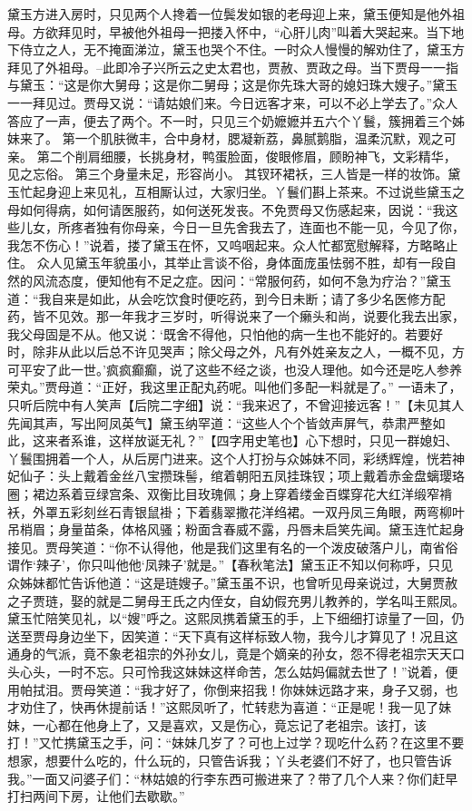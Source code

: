 \documentclass[12pt,oneside]{book}
\begin{document}
黛玉方进入房时，只见两个人搀着一位鬓发如银的老母迎上来，黛玉便知是他外祖母。方欲拜见时，早被他外祖母一把搂入怀中，“心肝儿肉”叫着大哭起来。当下地下侍立之人，无不掩面涕泣，黛玉也哭个不住。一时众人慢慢的解劝住了，黛玉方拜见了外祖母。--此即冷子兴所云之史太君也，贾赦、贾政之母。当下贾母一一指与黛玉：“这是你大舅母；这是你二舅母；这是你先珠大哥的媳妇珠大嫂子。”黛玉一一拜见过。贾母又说：“请姑娘们来。今日远客才来，可以不必上学去了。”众人答应了一声，便去了两个。不一时，只见三个奶嬷嬷并五六个丫鬟，簇拥着三个姊妹来了。
第一个肌肤微丰，合中身材，腮凝新荔，鼻腻鹅脂，温柔沉默，观之可亲。
第二个削肩细腰，长挑身材，鸭蛋脸面，俊眼修眉，顾盼神飞，文彩精华，见之忘俗。
第三个身量未足，形容尚小。
其钗环裙袄，三人皆是一样的妆饰。黛玉忙起身迎上来见礼，互相厮认过，大家归坐。丫鬟们斟上茶来。不过说些黛玉之母如何得病，如何请医服药，如何送死发丧。不免贾母又伤感起来，因说：“我这些儿女，所疼者独有你母亲，今日一旦先舍我去了，连面也不能一见，今见了你，我怎不伤心！”说着，搂了黛玉在怀，又呜咽起来。众人忙都宽慰解释，方略略止住。
众人见黛玉年貌虽小，其举止言谈不俗，身体面庞虽怯弱不胜，却有一段自然的风流态度，便知他有不足之症。因问：“常服何药，如何不急为疗治？”黛玉道：“我自来是如此，从会吃饮食时便吃药，到今日未断；请了多少名医修方配药，皆不见效。那一年我才三岁时，听得说来了一个癞头和尚，说要化我去出家，我父母固是不从。他又说：‘既舍不得他，只怕他的病一生也不能好的。若要好时，除非从此以后总不许见哭声；除父母之外，凡有外姓亲友之人，一概不见，方可平安了此一世。’疯疯癫癫，说了这些不经之谈，也没人理他。如今还是吃人参养荣丸。”贾母道：“正好，我这里正配丸药呢。叫他们多配一料就是了。”
一语未了，只听后院中有人笑声【后院二字细】说：“我来迟了，不曾迎接远客！”【未见其人先闻其声，写出阿凤英气】黛玉纳罕道：“这些人个个皆敛声屏气，恭肃严整如此，这来者系谁，这样放诞无礼？”【四字用史笔也】心下想时，只见一群媳妇、丫鬟围拥着一个人，从后房门进来。这个人打扮与众姊妹不同，彩绣辉煌，恍若神妃仙子：头上戴着金丝八宝攒珠髻，绾着朝阳五凤挂珠钗；项上戴着赤金盘螭璎珞圈；裙边系着豆绿宫条、双衡比目玫瑰佩；身上穿着缕金百蝶穿花大红洋缎窄褙袄，外罩五彩刻丝石青银鼠褂；下着翡翠撒花洋绉裙。一双丹凤三角眼，两弯柳叶吊梢眉；身量苗条，体格风骚；粉面含春威不露，丹唇未启笑先闻。黛玉连忙起身接见。贾母笑道：“你不认得他，他是我们这里有名的一个泼皮破落户儿，南省俗谓作‘辣子’，你只叫他他‘凤辣子’就是。”【春秋笔法】黛玉正不知以何称呼，只见众姊妹都忙告诉他道：“这是琏嫂子。”黛玉虽不识，也曾听见母亲说过，大舅贾赦之子贾琏，娶的就是二舅母王氏之内侄女，自幼假充男儿教养的，学名叫王熙凤。黛玉忙陪笑见礼，以“嫂”呼之。这熙凤携着黛玉的手，上下细细打谅量了一回，仍送至贾母身边坐下，因笑道：“天下真有这样标致人物，我今儿才算见了！况且这通身的气派，竟不象老祖宗的外孙女儿，竟是个嫡亲的孙女，怨不得老祖宗天天口头心头，一时不忘。只可怜我这妹妹这样命苦，怎么姑妈偏就去世了！”说着，便用帕拭泪。贾母笑道：“我才好了，你倒来招我！你妹妹远路才来，身子又弱，也才劝住了，快再休提前话！”这熙凤听了，忙转悲为喜道：“正是呢！我一见了妹妹，一心都在他身上了，又是喜欢，又是伤心，竟忘记了老祖宗。该打，该打！”又忙携黛玉之手，问：“妹妹几岁了？可也上过学？现吃什么药？在这里不要想家，想要什么吃的，什么玩的，只管告诉我；丫头老婆们不好了，也只管告诉我。”一面又问婆子们：“林姑娘的行李东西可搬进来了？带了几个人来？你们赶早打扫两间下房，让他们去歇歇。”
\end{document}
